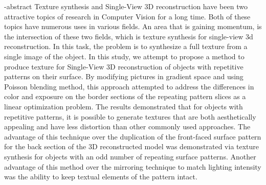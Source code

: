 
\en-abstract{
Texture synthesis and Single-View 3D reconstruction have been two attractive topics of research in Computer Vision for a long time. Both of these topics have numerous uses in various fields. An area that is gaining momentum, is the intersection of these two fields, which is texture synthesis for single-view 3d reconstruction.
%
In this task, the problem is to synthesize a full texture from a single image of the object.
%
In this study, we attempt to propose a method to produce texture for Single-View 3D reconstruction of objects with repetitive patterns on their surface. By modifying pictures in gradient space and using Poisson blending method, this approach attempted to address the differences in color and exposure on the border sections of the repeating pattern slices as a linear optimization problem.
%
The results demonstrated that for objects with repetitive patterns, it is possible to generate textures that are both aesthetically appealing and have less distortion than other commonly used approaches. 
%
The advantage of this technique over the duplication of the front-faced surface pattern for the back section of the 3D reconstructed model was demonstrated via texture synthesis for objects with an odd number of repeating surface patterns. 
%
Another advantage of this method over the mirroring technique to match lighting intensity was the ability to keep textual elements of the pattern intact.
}